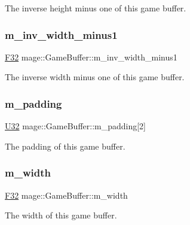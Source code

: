 The inverse height minus one of this game buffer. \hypertarget{structmage_1_1_game_buffer_a2ebfec7129ca68d65dd5cf33e32b523e}{}\label{structmage_1_1_game_buffer_a2ebfec7129ca68d65dd5cf33e32b523e} 
\subsubsection{\texorpdfstring{m\+\_\+inv\+\_\+width\+\_\+minus1}{m\_inv\_width\_minus1}}
{\footnotesize\ttfamily \hyperlink{namespacemage_aa97e833b45f06d60a0a9c4fc22ae02c0}{F32} mage\+::\+Game\+Buffer\+::m\+\_\+inv\+\_\+width\+\_\+minus1}

The inverse width minus one of this game buffer. \hypertarget{structmage_1_1_game_buffer_a6ab9b395e6cf4a6e120bb7ddf4be6913}{}\label{structmage_1_1_game_buffer_a6ab9b395e6cf4a6e120bb7ddf4be6913} 
\subsubsection{\texorpdfstring{m\+\_\+padding}{m\_padding}}
{\footnotesize\ttfamily \hyperlink{namespacemage_a41c104c036fba3756a74e19f793eeaa1}{U32} mage\+::\+Game\+Buffer\+::m\+\_\+padding\mbox{[}2\mbox{]}}

The padding of this game buffer. \hypertarget{structmage_1_1_game_buffer_a96c0f7cbd8fb9298b67be6fcedfae0ea}{}\label{structmage_1_1_game_buffer_a96c0f7cbd8fb9298b67be6fcedfae0ea} 
\subsubsection{\texorpdfstring{m\+\_\+width}{m\_width}}
{\footnotesize\ttfamily \hyperlink{namespacemage_aa97e833b45f06d60a0a9c4fc22ae02c0}{F32} mage\+::\+Game\+Buffer\+::m\+\_\+width}

The width of this game buffer. 